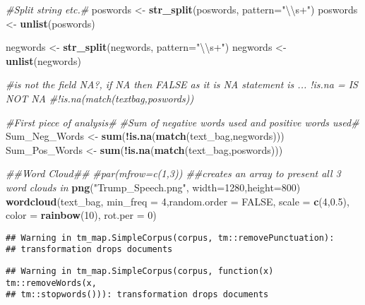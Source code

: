\documentclass[]{article}
\newenvironment{Shaded}{\begin{snugshade}}{\end{snugshade}}
\newcommand{\CharTok}[1]{\textcolor[rgb]{0.31,0.60,0.02}{#1}}
\newcommand{\CommentTok}[1]{\textcolor[rgb]{0.56,0.35,0.01}{\textit{#1}}}
\newcommand{\DataTypeTok}[1]{\textcolor[rgb]{0.13,0.29,0.53}{#1}}
\newcommand{\DecValTok}[1]{\textcolor[rgb]{0.00,0.00,0.81}{#1}}
\newcommand{\FloatTok}[1]{\textcolor[rgb]{0.00,0.00,0.81}{#1}}
\newcommand{\KeywordTok}[1]{\textcolor[rgb]{0.13,0.29,0.53}{\textbf{#1}}}
\newcommand{\NormalTok}[1]{#1}
\newcommand{\OperatorTok}[1]{\textcolor[rgb]{0.81,0.36,0.00}{\textbf{#1}}}
\newcommand{\OtherTok}[1]{\textcolor[rgb]{0.56,0.35,0.01}{#1}}
\newcommand{\StringTok}[1]{\textcolor[rgb]{0.31,0.60,0.02}{#1}}
\begin{document}
\begin{Shaded}
\begin{Highlighting}[]
\CommentTok{#Split string etc.#}
\NormalTok{poswords <-}\StringTok{ }\KeywordTok{str_split}\NormalTok{(poswords, }\DataTypeTok{pattern=}\StringTok{"}\CharTok{\textbackslash{}\textbackslash{}}\StringTok{s+"}\NormalTok{)}
\NormalTok{poswords <-}\StringTok{ }\KeywordTok{unlist}\NormalTok{(poswords)}

\NormalTok{negwords <-}\StringTok{ }\KeywordTok{str_split}\NormalTok{(negwords, }\DataTypeTok{pattern=}\StringTok{"}\CharTok{\textbackslash{}\textbackslash{}}\StringTok{s+"}\NormalTok{)}
\NormalTok{negwords <-}\StringTok{ }\KeywordTok{unlist}\NormalTok{(negwords)}

\CommentTok{#is not the field NA?, if NA then FALSE as it is NA statement is ... !is.na = IS NOT NA}
\CommentTok{#!is.na(match(textbag,poswords)) }


\CommentTok{#First piece of analysis#}
\CommentTok{#Sum of negative words used and positive words used#}
\NormalTok{Sum_Neg_Words <-}\StringTok{ }\KeywordTok{sum}\NormalTok{(}\OperatorTok{!}\KeywordTok{is.na}\NormalTok{(}\KeywordTok{match}\NormalTok{(text_bag,negwords)))}
\NormalTok{Sum_Pos_Words <-}\StringTok{ }\KeywordTok{sum}\NormalTok{(}\OperatorTok{!}\KeywordTok{is.na}\NormalTok{(}\KeywordTok{match}\NormalTok{(text_bag,poswords)))}


\CommentTok{##Word Cloud##}
\CommentTok{#par(mfrow=c(1,3)) ##creates an array to present all 3 word clouds in}
\KeywordTok{png}\NormalTok{(}\StringTok{"Trump_Speech.png"}\NormalTok{, }\DataTypeTok{width=}\DecValTok{1280}\NormalTok{,}\DataTypeTok{height=}\DecValTok{800}\NormalTok{)}
\KeywordTok{wordcloud}\NormalTok{(text_bag, }\DataTypeTok{min_freq =} \DecValTok{4}\NormalTok{,}\DataTypeTok{random.order =} \OtherTok{FALSE}\NormalTok{, }\DataTypeTok{scale =} \KeywordTok{c}\NormalTok{(}\DecValTok{4}\NormalTok{,}\FloatTok{0.5}\NormalTok{), }\DataTypeTok{color =} \KeywordTok{rainbow}\NormalTok{(}\DecValTok{10}\NormalTok{), }\DataTypeTok{rot.per =} \DecValTok{0}\NormalTok{)}
\end{Highlighting}
\end{Shaded}

\begin{verbatim}
## Warning in tm_map.SimpleCorpus(corpus, tm::removePunctuation):
## transformation drops documents
\end{verbatim}

\begin{verbatim}
## Warning in tm_map.SimpleCorpus(corpus, function(x) tm::removeWords(x,
## tm::stopwords())): transformation drops documents
\end{verbatim}
\end{document}
